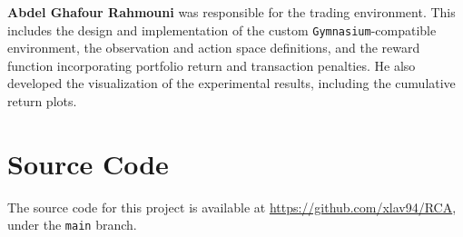 \documentclass[final]{article}
\begin{document}
\textbf{Abdel Ghafour Rahmouni} was responsible for the trading environment. This includes the design and implementation
of the custom \texttt{Gymnasium}-compatible environment, the observation and action space definitions, and the reward
function incorporating portfolio return and transaction penalties. He also developed the visualization of the experimental
results, including the cumulative return plots.

\section{Source Code}
The source code for this project is available at \url{https://github.com/xlav94/RCA}, under the \texttt{main} branch.

\newpage




\end{document}

